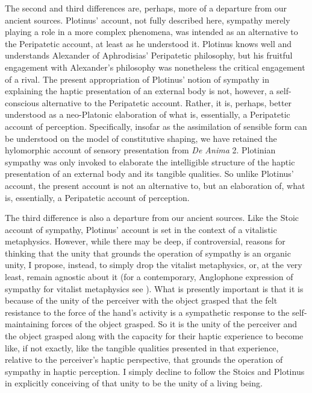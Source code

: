 The second and third differences are, perhaps, more of a departure from our ancient sources. Plotinus' account, not fully described here, sympathy merely playing a role in a more complex phenomena, was intended as an alternative to the Peripatetic account, at least as he understood it. Plotinus knows well and understands Alexander of Aphrodisias' Peripatetic philosophy, but his fruitful engagement with Alexander's philosophy was nonetheless the critical engagement of a rival. The present appropriation of Plotinus' notion of sympathy in explaining the haptic presentation of an external body is not, however, a self-conscious alternative to the Peripatetic account. Rather, it is, perhaps, better understood as a neo-Platonic elaboration of what is, essentially, a Peripatetic account of perception. Specifically, insofar as the assimilation of sensible form can be understood on the model of constitutive shaping, we have retained the hylomorphic account of sensory presentation from \emph{De Anima} 2. Plotinian sympathy was only invoked to elaborate the intelligible structure of the haptic presentation of an external body and its tangible qualities. So unlike Plotinus' account, the present account is not an alternative to, but an elaboration of, what is, essentially, a Peripatetic account of perception.

The third difference is also a departure from our ancient sources. Like the Stoic account of sympathy, Plotinus' account is set in the context of a vitalistic metaphysics. However, while there may be deep, if controversial, reasons for thinking that the unity that grounds the operation of sympathy is an organic unity, I propose, instead, to simply drop the vitalist metaphysics, or, at the very least, remain agnostic about it (for a contemporary, Anglophone expression of sympathy for vitalist metaphysics see \citealt{Nagel:2012as}). What is presently important is that it is because of the unity of the perceiver with the object grasped that the felt resistance to the force of the hand's activity is a sympathetic response to the self-maintaining forces of the object grasped. So it is the unity of the perceiver and the object grasped along with the capacity for their haptic experience to become like, if not exactly, like the tangible qualities presented in that experience, relative to the perceiver's haptic perspective, that grounds the operation of sympathy in haptic perception. I simply decline to follow the Stoics and Plotinus in explicitly conceiving of that unity to be the unity of a living being.

